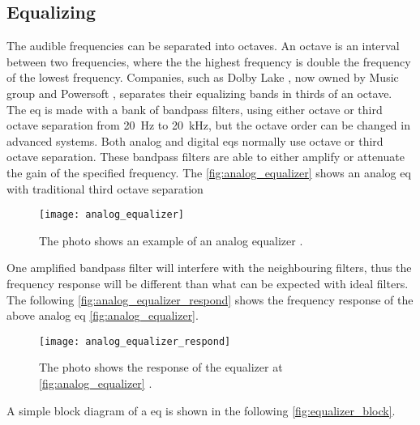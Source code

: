 \subsection{Equalizing}\label{sec:equalizing} 
The audible frequencies can be separated into octaves. An octave is an interval between two frequencies, where the the highest frequency is double the frequency of the lowest frequency. Companies, such as Dolby Lake \citep{lab_gruppen_eq}, now owned by Music group and Powersoft \citep{powersoft_eq}, separates their equalizing bands in thirds of an octave. 
The \gls{eq} is made with a bank of bandpass filters, using either octave or third octave separation from \SI{20}{\hertz} to \SI{20}{\kilo\hertz}, but the octave order can be changed in advanced systems. Both analog and digital \gls{eq}s normally use octave or third octave separation. These bandpass filters are able to either amplify or attenuate the gain of the specified frequency. The \autoref{fig:analog_equalizer} shows an analog \gls{eq} with traditional third octave separation \citep{nordic}

\begin{figure} [htbp]
 \centering
  \texttt{[image: analog\_equalizer]}
  \caption{The photo shows an example of an analog equalizer \citep{nordic}.}
  \label{fig:analog_equalizer}
\end{figure}

One amplified bandpass filter will interfere with the neighbouring filters, thus the frequency response will be different than what can be expected with ideal filters. The following \autoref{fig:analog_equalizer_respond} shows the frequency response of the above analog \gls{eq} \autoref{fig:analog_equalizer}.

\begin{figure} [htbp]
 \centering
  \texttt{[image: analog\_equalizer\_respond]}
  \caption{The photo shows the response of the equalizer at \autoref{fig:analog_equalizer} \citep{nordic}.}
  \label{fig:analog_equalizer_respond}
\end{figure}

A simple block diagram of a \gls{eq}  is shown in the following \autoref{fig:equalizer_block}.


